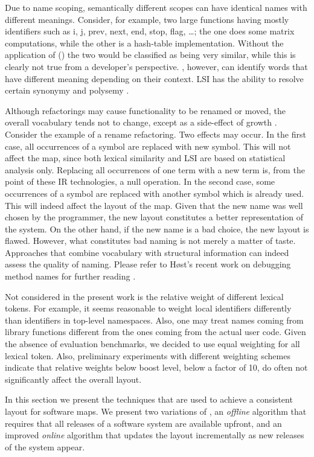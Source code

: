 Due to name scoping, semantically different scopes can have identical names with different meanings. Consider, for example, two large functions having mostly identifiers such as i, j, prev, next, end, stop, flag, \dots;  the one does some matrix computations, while the other is a hash-table implementation. Without the application of \LSI () the two would be classified as being very similar, while this is clearly not true from a developer's perspective. \LSI, however, can identify words that have different meaning depending on their context. LSI has the ability to resolve certain synonymy and polysemy \cite{Deer90a}.


Although refactorings may cause functionality to be renamed or moved, the overall vocabulary tends not to change, except as a side-effect of growth \cite{Zhan08a,Vasa07b}. Consider the example of a rename refactoring. Two effects may occur. 
In the first case, all occurrences of a symbol are replaced with new symbol. This will not affect the map, since both lexical similarity and LSI are based on statistical analysis only. Replacing all occurrences of one term with a new term is, from the point of these IR technologies, a null operation. In the second case, some occurrences of a symbol are replaced with another symbol which is already used. This will indeed affect the layout of the map. Given that the new name was well chosen by the programmer, the new layout constitutes a better representation of the system. On the other hand, if the new name is a bad choice, the new layout is flawed. However, what constitutes bad naming is not merely a matter of taste. Approaches that combine vocabulary with structural information can indeed assess the quality of naming. Please refer to H\o{}st's recent work on debugging method names for further reading \cite{Hoes09a}.

Not considered in the present work is the relative weight of different lexical tokens. For example, it seems reasonable to weight local identifiers differently than identifiers in top-level namespaces. Also, one may treat names coming from library functions different from the ones coming from the actual user code. Given the absence of evaluation benchmarks, we decided to use equal weighting for all lexical token. Also, preliminary experiments with different weighting schemes indicate that relative weights below boost level, \ie below a factor of 10, do often not significantly affect the overall layout.

In this section we present the techniques that are used to achieve a consistent layout for software maps. We present two variations of \SOCA, an \emph{offline} algorithm that requires that all releases of a software system are available upfront, and an improved \emph{online} algorithm that updates the layout incrementally as new releases of the system appear. 

